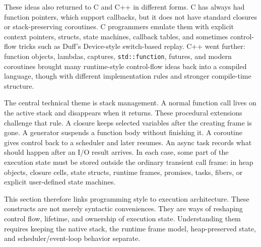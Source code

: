 These ideas also returned to C and C++ in different forms. C has always had function pointers, which support callbacks, but it does not have standard closures or stack-preserving coroutines. C programmers emulate them with explicit context pointers, structs, state machines, callback tables, and sometimes control-flow tricks such as Duff's Device-style switch-based replay. C++ went further: function objects, lambdas, captures, \texttt{std::function}, futures, and modern coroutines brought many runtime-style control-flow ideas back into a compiled language, though with different implementation rules and stronger compile-time structure.

The central technical theme is stack management. A normal function call lives on the active stack and disappears when it returns. These procedural extensions challenge that rule. A closure keeps selected variables after the creating frame is gone. A generator suspends a function body without finishing it. A coroutine gives control back to a scheduler and later resumes. An async task records what should happen after an I/O result arrives. In each case, some part of the execution state must be stored outside the ordinary transient call frame: in heap objects, closure cells, state structs, runtime frames, promises, tasks, fibers, or explicit user-defined state machines.

This section therefore links programming style to execution architecture. These constructs are not merely syntactic conveniences. They are ways of reshaping control flow, lifetime, and ownership of execution state. Understanding them requires keeping the native stack, the runtime frame model, heap-preserved state, and scheduler/event-loop behavior separate.